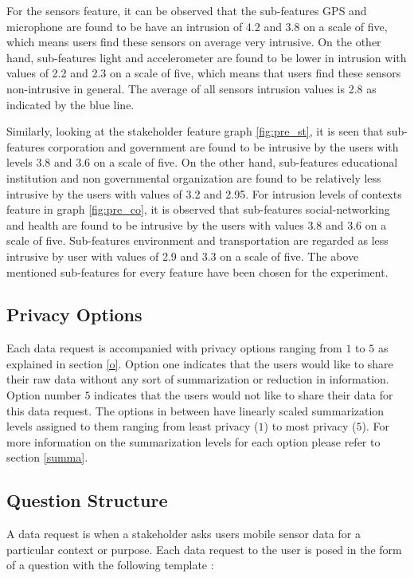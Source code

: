 For the sensors feature, it can be observed that the sub-features GPS and microphone are found to be have an intrusion of 4.2 and 3.8 on a scale of five, which means users find these sensors on average very intrusive. On the other hand, sub-features light and accelerometer are found to be lower in intrusion with values of 2.2 and 2.3 on a scale of five, which means that users find these sensors non-intrusive in general. The average of all sensors intrusion values is 2.8 as indicated by the blue line.

Similarly, looking at the stakeholder feature graph \ref{fig:pre_st}, it is seen that sub-features  corporation and government are found to be intrusive by the users with levels 3.8 and 3.6 on a scale of five. On the other hand, sub-features educational institution and non governmental organization are found to be relatively less intrusive by the users with values of 3.2 and 2.95. For intrusion levels of contexts feature in graph \ref{fig:pre_co}, it is observed that sub-features social-networking and health are found to be intrusive by the users with values 3.8 and 3.6 on a scale of five. Sub-features environment and
transportation are regarded as less intrusive by user with values of 2.9 and 3.3 on a scale of five. The above mentioned sub-features for every feature have been chosen for the experiment.


\subsection{Privacy Options} \label{options}

Each data request is accompanied with privacy options ranging from $1$ to $5$ as explained in section \ref{o}. Option one indicates that the users would like to
share their raw data without any sort of summarization or reduction in information. Option number $5$ indicates that the users would not like to share their data for this data request.
The options in between have linearly scaled summarization levels assigned to them ranging from least privacy ($1$) to most privacy ($5$). For more information on the summarization levels for each option please refer to section \ref{summa}. 

\subsection{Question Structure}

A data request is when a stakeholder asks users mobile sensor data for a particular context or purpose. Each data request to the user is posed in the form of a question with the following template :


